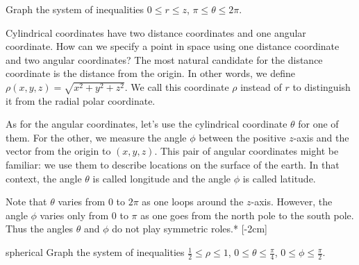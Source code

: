 \documentclass[prettycode,shellescape]{watsonbook}
\begin{document}
\begin{exercise}{}{}
  Graph the system of inequalities $0 \leq r \leq z$, \: $\pi \leq \theta
  \leq 2\pi$. 
\end{exercise}

Cylindrical coordinates have two distance coordinates and one angular
coordinate. How can we specify a point in space using one distance
coordinate and two angular coordinates? The most natural candidate for
the distance coordinate is the distance from the origin. In other
words, we define $\rho(x,y,z) = \sqrt{x^2 + y^2 + z^2}$. We call this
coordinate $\rho$ instead of $r$ to distinguish it from the radial
polar coordinate.

As for the angular coordinates, let's use the cylindrical coordinate
$\theta$ for one of them. For the other, we measure the angle $\phi$
between the positive $z$-axis and the vector from the origin to
$(x,y,z)$. This pair of angular coordinates might be familiar: we use
them to describe locations on the surface of the earth. In that
context, the angle $\theta$ is called longitude and the angle $\phi$
is called latitude.

Note that $\theta$ varies from 0 to $2\pi$ as one loops around the
$z$-axis. However, the angle $\phi$ varies only from 0 to $\pi$ as one
goes from the north pole to the south pole. Thus the angles $\theta$
and $\phi$ do not play symmetric roles.* [-2cm]

\begin{example}{}{spherical}
  Graph the system of inequalities $\tfrac{1}{2} \leq \rho \leq 1$, \: $0
  \leq \theta \leq \tfrac{\pi}{4}$, \: $0 \leq \phi \leq \tfrac{\pi}{2}$. 
\end{example}
\end{document}
